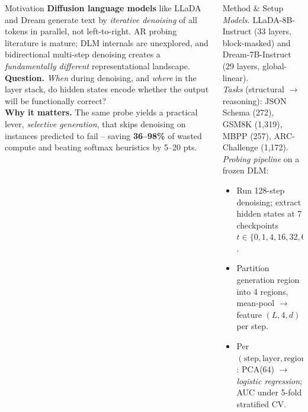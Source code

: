 \documentclass[final,t]{beamer}
\newlength{\colw}
\newlength{\gutter}
\newlength{\sidemargin}
\begin{document}
\begin{frame}[t]
\begin{columns}[T]
\hspace{\sidemargin}
\begin{column}{\colw}
\begin{block}{Motivation}
\textbf{Diffusion language models} like LLaDA and Dream generate text by \emph{iterative denoising} of all tokens in parallel, not left-to-right. AR probing literature is mature; DLM internals are unexplored, and bidirectional multi-step denoising creates a \emph{fundamentally different} representational landscape.\\
\textbf{Question.} \emph{When} during denoising, and \emph{where} in the layer stack, do hidden states encode whether the output will be functionally correct?\\
\textbf{Why it matters.} The same probe yields a practical lever, \emph{selective generation}, that skips denoising on instances predicted to fail -- saving \textbf{36--98\%} of wasted compute and beating softmax heuristics by 5--20 pts.
\end{block}
\end{column}
\hspace{\gutter}
\begin{column}{\colw}
\begin{block}{Method \& Setup}
\emph{Models.} LLaDA-8B-Instruct (33 layers, block-masked) and Dream-7B-Instruct (29 layers, global-linear).
\vspace{0.25cm}\\
\emph{Tasks} (structural $\to$ reasoning): JSON Schema (272), GSM8K (1{,}319), MBPP (257), ARC-Challenge (1{,}172).
\vspace{0.25cm}\\
\emph{Probing pipeline} on a frozen DLM:
\begin{itemize}\setlength\itemsep{0.9ex}
  \item Run 128-step denoising; extract hidden states at 7 checkpoints $t\in\{0,1,4,16,32,64,127\}$.
  \item Partition generation region into 4 regions, mean-pool $\to$ feature $(L,4,d)$ per step.
  \item Per $(\text{step},\text{layer},\text{region})$: PCA(64) $\to$ \emph{logistic regression}; AUC under 5-fold stratified CV.
\end{itemize}
\end{block}
\end{column}
\hspace{\gutter}

\end{columns}
\end{frame}
\end{document}
